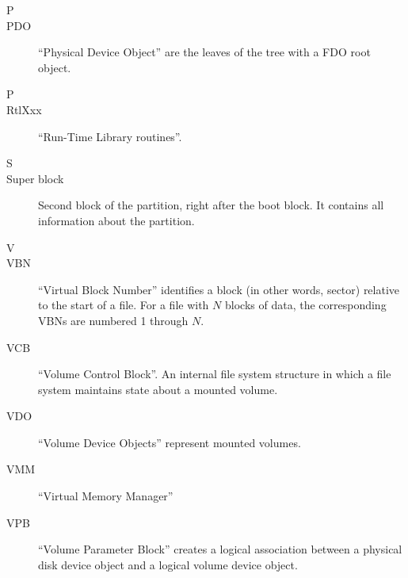 \begin{description}
\item[\Large{P}]
\item[PDO] ``Physical Device Object'' are the leaves of the tree with a FDO root object.

\item[\Large{P}]
\item[RtlXxx] ``Run-Time Library routines''.

\item[\Large{S}]
\item[Super block] Second block of the partition, right after the boot block. It contains all information about the partition.
\item[\Large{V}]
\item[VBN] ``Virtual Block Number'' identifies a block (in other words, sector) relative to the start of a file. For a file with $N$ blocks of data, the corresponding VBNs are numbered 1 through $N$. 
\item[VCB] ``Volume Control Block''. An internal file system structure in which a file system maintains state about a mounted volume.
\item[VDO] ``Volume Device Objects'' represent mounted volumes.
\item[VMM] ``Virtual Memory Manager''
\item[VPB] ``Volume Parameter Block'' creates a logical association between a physical disk device object and a logical volume device object.
\end{description}
